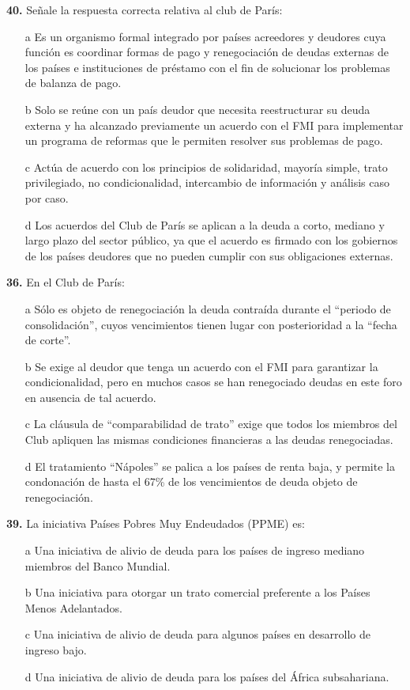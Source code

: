 \documentclass{nuevotema}
\begin{document}

\textbf{40.} Señale la respuesta correcta relativa al club de París:
\begin{itemize}
	\item[a] Es un organismo formal integrado por países acreedores y deudores cuya función es coordinar formas de pago y renegociación de deudas externas de los países e instituciones de préstamo con el fin de solucionar los problemas de balanza de pago.
	\item[b] Solo se reúne con un país deudor que necesita reestructurar su deuda externa y ha alcanzado previamente un acuerdo con el FMI para implementar un programa de reformas que le permiten resolver sus problemas de pago.
	\item[c] Actúa de acuerdo con los principios de solidaridad, mayoría simple, trato privilegiado, no condicionalidad, intercambio de información y análisis caso por caso.
	\item[d] Los acuerdos del Club de París se aplican a la deuda a corto, mediano y largo plazo del sector público, ya que el acuerdo es firmado con los gobiernos de los países deudores que no pueden cumplir con sus obligaciones externas.
\end{itemize}


\textbf{36.} En el Club de París:

\begin{itemize}
	\item[a] Sólo es objeto de renegociación la deuda contraída durante el ``periodo de consolidación'', cuyos vencimientos tienen lugar con posterioridad a la ``fecha de corte''.
	\item[b] Se exige al deudor que tenga un acuerdo con el FMI para garantizar la condicionalidad, pero en muchos casos se han renegociado deudas en este foro en ausencia de tal acuerdo.
	\item[c] La cláusula de ``comparabilidad de trato'' exige que todos los miembros del Club apliquen las mismas condiciones financieras a las deudas renegociadas.
	\item[d] El tratamiento ``Nápoles'' se palica a los países de renta baja, y permite la condonación de hasta el 67\% de los vencimientos de deuda objeto de renegociación.
\end{itemize}


\textbf{39.} La iniciativa Países Pobres Muy Endeudados (PPME) es:
\begin{itemize}
	\item[a] Una iniciativa de alivio de deuda para los países de ingreso mediano miembros del Banco Mundial.
	\item[b] Una iniciativa para otorgar un trato comercial preferente a los Países Menos Adelantados.
	\item[c] Una iniciativa de alivio de deuda para algunos países en desarrollo de ingreso bajo.
	\item[d] Una iniciativa de alivio de deuda para los países del África subsahariana.
\end{itemize}
\end{document}
